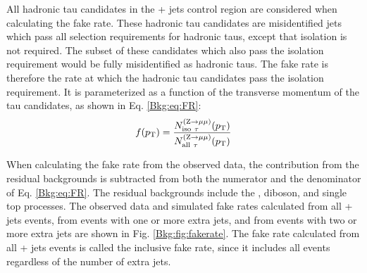 All hadronic tau candidates in the \Zmm + jets control region are considered when calculating the fake rate. These hadronic tau candidates are misidentified jets which pass all selection requirements for hadronic taus, except that isolation is not required. The subset of these candidates which also pass the isolation requirement would be fully misidentified as hadronic taus. The fake rate is therefore the rate at which the hadronic tau candidates pass the isolation requirement. It is parameterized as a function of the transverse momentum of the tau candidates, as shown in Eq. \eqref{Bkg:eq:FR}:
\begin{equation} f(p_{\mathrm{T}}) = \frac{N_{\text{iso}~\tau}^{(\mathrm{Z} \rightarrow \mu\mu)}(p_{\mathrm{T}})}{N_{\text{all}~\tau}^{(\mathrm{Z} \rightarrow \mu\mu)}(p_{\mathrm{T}})} \label{Bkg:eq:FR} \end{equation}


When calculating the fake rate from the observed data, the contribution from the residual backgrounds is subtracted from both the numerator and the denominator of Eq. \eqref{Bkg:eq:FR}. The residual backgrounds include the \ttbar, diboson, and single top processes. The observed data and simulated fake rates calculated from all \Zmm + jets events, from events with one or more extra jets, and from events with two or more extra jets are shown in Fig. \ref{Bkg:fig:fakerate}. The fake rate calculated from all \Zmm + jets events is called the inclusive fake rate, since it includes all events regardless of the number of extra jets.

